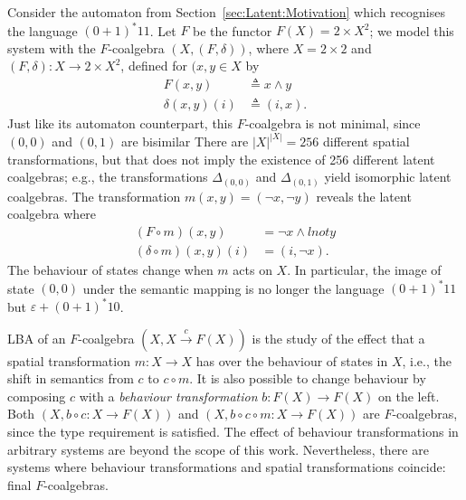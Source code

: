 \begin{example}
\label{ex:Latent:TheExample}
Consider the automaton from Section~\ref{sec:Latent:Motivation} which recognises the language $(0+1)^*11$. Let $F$ be the functor $F(X)=2\times X^2$; we model this system with the $F$-coalgebra $(X,(F,\delta))$, where $X=2\times2$ and $(F,\delta)\colon X\rightarrow 2\times X^2$, defined for $(x,y\in X$ by
\begin{align}
    F(x,y)&\triangleq x \land y\\
    \delta(x,y)(i)&\triangleq (i,x).
\end{align}
Just like its automaton counterpart, this $F$-coalgebra is not minimal, since $(0,0)$ and $(0,1)$ are bisimilar
There are $|X|^{|X|}=256$ different spatial transformations, but that does not imply the existence of 256 different latent coalgebras; e.g., the transformations $\Delta_{(0,0)}$ and $\Delta_{(0,1)}$ yield isomorphic latent coalgebras. 
The transformation $m(x,y)=(\lnot x,\lnot y)$ reveals the latent coalgebra where 
\begin{align}
    (F\circ m)(x,y)&= \lnot x \land lnot y\\
    (\delta\circ m)(x,y)(i)&= (i,\lnot x).
\end{align}
The behaviour of states change when $m$ acts on $X$. In particular, the image of state $(0,0)$ under the semantic mapping is no longer the language $(0+1)^*11$ but $\varepsilon +(0+1)^*10$.
\end{example}

LBA of an $F$-coalgebra $(X,X\xrightarrow{c} F(X))$ is the study of the effect that a spatial transformation $m\colon X\rightarrow X$ has over the behaviour of states in $X$, i.e., the shift in semantics from $c$ to $c\circ m$. It is also possible to change behaviour by composing $c$ with a \emph{behaviour transformation} $b\colon F(X)\rightarrow F(X)$ on the left. Both $(X,b\circ c\colon X\rightarrow F(X))$ and $(X,b\circ c\circ m\colon X\rightarrow F(X))$ are $F$-coalgebras, since the type requirement is satisfied. The effect of behaviour transformations in arbitrary systems are beyond the scope of this work. Nevertheless, there are systems where behaviour transformations and spatial transformations coincide: final $F$-coalgebras.

